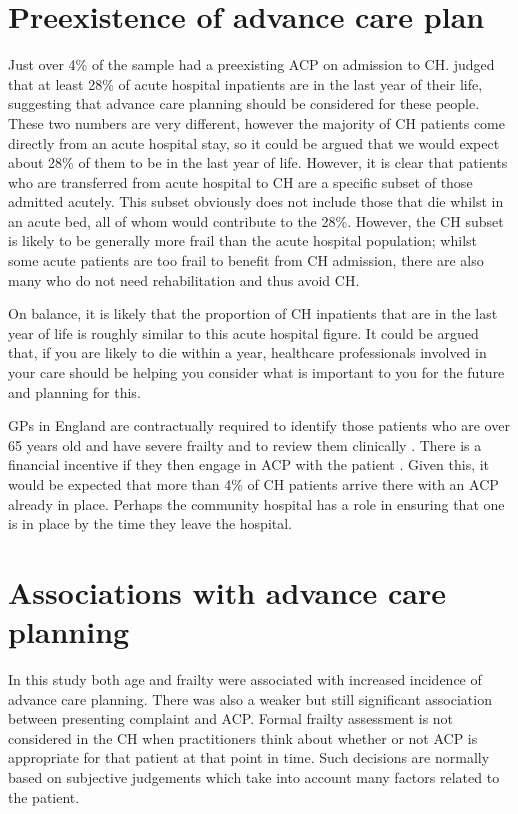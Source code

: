 \documentclass
[
	12pt,
	a4paper,
	oneside,
]{report}
\begin{document}
\section{Preexistence of advance care plan}

Just over 4\% of the sample had a preexisting ACP on admission to CH. 
\textcite{clarke:14} judged that at least 28\% of acute hospital 
inpatients are in the last year of their life, suggesting that advance care 
planning should be considered for these people. 
These two numbers are very different, however the majority of CH patients 
come directly from an acute hospital
stay, so it could be argued that we would expect about 28\% of them to be in
the last year of life. However, it is clear that patients who are transferred 
from acute hospital to CH are a specific subset of those admitted acutely.
This subset obviously does not include those that die whilst in an acute bed,
all of whom would contribute to the 28\%.  However, the CH subset is likely 
to be generally more frail than the acute hospital population; whilst some
acute patients are too frail to benefit from CH admission, there are also many 
who do not need rehabilitation and thus avoid CH.

On balance, it is likely that the proportion of CH inpatients that are in the
last year of life is roughly similar to this acute hospital figure. It
could be argued that, if you are likely to die within a year, healthcare
professionals involved in your care should be helping you consider what
is important to you for the future and planning for this. 


GPs in England are contractually required to identify those patients who are 
over 65 years old and have severe frailty and to review them clinically
\parencite{nhse:17}. There is a financial incentive if they then
engage in ACP with the patient \parencite{hunt:16}. Given
this, it would be expected that more than 4\% of CH patients arrive there
with an ACP already in place. Perhaps the community hospital has a role in
ensuring that one is in place by the time they leave the hospital.

\section{Associations with advance care planning}

In this study both age and frailty were associated with increased incidence of
advance care planning. There was also a weaker but still significant association
between presenting complaint and ACP. Formal frailty assessment is not 
considered in the CH when practitioners think about whether or not ACP is 
appropriate for that patient at that point in time. Such decisions are normally
based on subjective judgements which take into account many factors related to
the patient.
\end{document}
